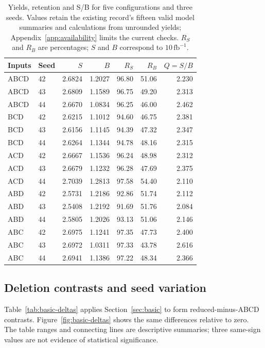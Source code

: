 \documentclass[11pt,a4paper]{article}
\begin{document}
\begin{table}[H]
\caption{Yields, retention and S/B for five configurations and three seeds. Values retain the existing record's fifteen valid model summaries and calculations from unrounded yields; Appendix~\ref{app:availability} limits the current checks. $R_S$ and $R_B$ are percentages; $S$ and $B$ correspond to $10\,\mathrm{fb}^{-1}$.}
\label{tab:basic-all}
\centering\small
\begin{tabular}{llrrrrr}
\toprule
Inputs & Seed & $S$ & $B$ & $R_S$ & $R_B$ & $Q=S/B$ \\
\midrule
ABCD & 42 & 2.6824 & 1.2027 & 96.80 & 51.06 & 2.230 \\
ABCD & 43 & 2.6809 & 1.1589 & 96.75 & 49.20 & 2.313 \\
ABCD & 44 & 2.6670 & 1.0834 & 96.25 & 46.00 & 2.462 \\
\addlinespace
BCD & 42 & 2.6215 & 1.1012 & 94.60 & 46.75 & 2.381 \\
BCD & 43 & 2.6156 & 1.1145 & 94.39 & 47.32 & 2.347 \\
BCD & 44 & 2.6264 & 1.1344 & 94.78 & 48.16 & 2.315 \\
\addlinespace
ACD & 42 & 2.6667 & 1.1536 & 96.24 & 48.98 & 2.312 \\
ACD & 43 & 2.6679 & 1.1232 & 96.28 & 47.69 & 2.375 \\
ACD & 44 & 2.7039 & 1.2813 & 97.58 & 54.40 & 2.110 \\
\addlinespace
ABD & 42 & 2.5731 & 1.2186 & 92.86 & 51.74 & 2.112 \\
ABD & 43 & 2.5408 & 1.2192 & 91.69 & 51.76 & 2.084 \\
ABD & 44 & 2.5805 & 1.2026 & 93.13 & 51.06 & 2.146 \\
\addlinespace
ABC & 42 & 2.6975 & 1.1241 & 97.35 & 47.73 & 2.400 \\
ABC & 43 & 2.6972 & 1.0311 & 97.33 & 43.78 & 2.616 \\
ABC & 44 & 2.6941 & 1.1386 & 97.22 & 48.34 & 2.366 \\
\bottomrule
\end{tabular}
\end{table}

\subsection{Deletion contrasts and seed variation}
Table~\ref{tab:basic-deltas} applies Section~\ref{sec:basic} to form reduced-minus-ABCD contrasts.
Figure~\ref{fig:basic-deltas} shows the same differences relative to zero.
The table ranges and connecting lines are descriptive summaries; three same-sign values are not evidence of statistical significance.
\end{document}
